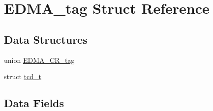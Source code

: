 \hypertarget{structEDMA__tag}{}\section{E\+D\+M\+A\+\_\+tag Struct Reference}
\label{structEDMA__tag}
\subsection*{Data Structures}
\begin{DoxyCompactItemize}
\item 
union \mbox{\hyperlink{unionEDMA__tag_1_1EDMA__CR__tag}{E\+D\+M\+A\+\_\+\+C\+R\+\_\+tag}}
\item 
struct \mbox{\hyperlink{structEDMA__tag_1_1tcd__t}{tcd\+\_\+t}}
\end{DoxyCompactItemize}
\subsection*{Data Fields}
